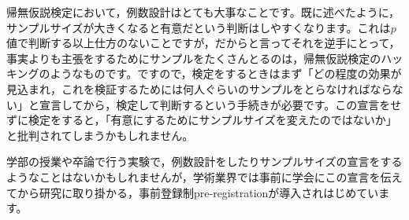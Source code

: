 \documentclass{ltjsarticle}
\begin{document}
帰無仮説検定において，例数設計はとても大事なことです。既に述べたように，サンプルサイズが大きくなると有意だという判断はしやすくなります。これは$p$値で判断する以上仕方のないことですが，だからと言ってそれを逆手にとって，事実よりも主張をするためにサンプルをたくさんとるのは，帰無仮説検定のハッキングのようなものです。ですので，検定をするときはまず「どの程度の効果が見込まれ，これを検証するためには何人ぐらいのサンプルをとらなければならない」と宣言してから，検定して判断するという手続きが必要です。この宣言をせずに検定をすると，「有意にするためにサンプルサイズを変えたのではないか」と批判されてしまうかもしれません。

学部の授業や卒論で行う実験で，例数設計をしたりサンプルサイズの宣言をするようなことはないかもしれませんが，学術業界では事前に学会にこの宣言を伝えてから研究に取り掛かる，事前登録制pre-registrationが導入されはじめています。
\end{document}
